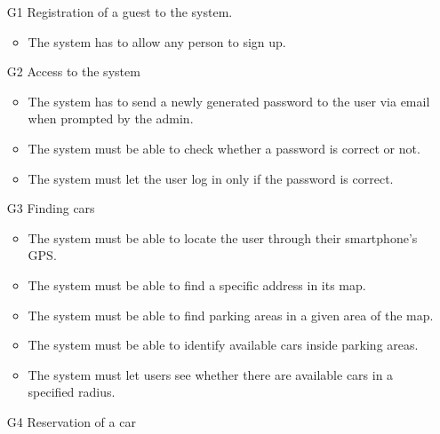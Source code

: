
\begin{itemize}

	
	\item [G1] Registration of a guest to the system.%
		\begin{itemize}
			\item The system has to allow any person to sign up. 
		\end{itemize}
	\item [G2] Access to the system %
		\begin{itemize}
			\item The system has to send a newly generated password to the user via email when prompted by the admin.
			\item The system must be able to check whether a password is correct or not.
			\item The system must let the user log in only if the password is correct. 
		\end{itemize}
	\item [G3] Finding cars %
		\begin{itemize}
			\item The system must be able to locate the user through their smartphone's GPS.
			\item The system must be able to find a specific address in its map. %
			\item The system must be able to find parking areas in a given area of the map. 
			\item The system must be able to identify available cars inside parking areas.
			\item The system must let users see whether there are available cars in a specified radius. 
		\end{itemize}
	\item [G4] Reservation of a car %
		\begin{itemize}

\end{itemize}
\end{itemize}
